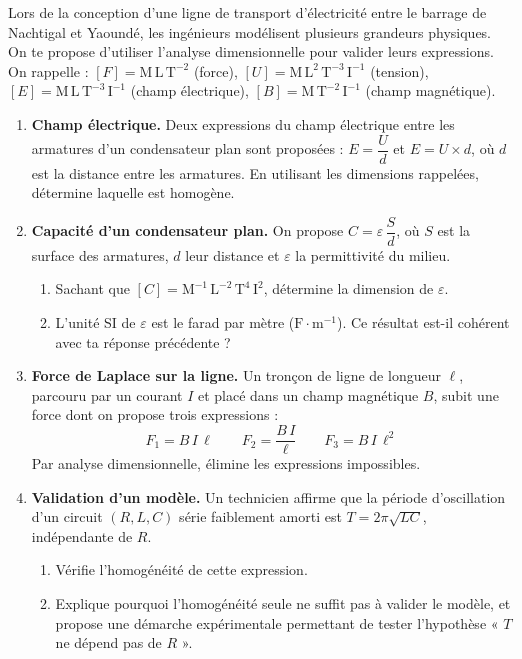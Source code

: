 \documentclass[11pt]{article}
\begin{document}
\begin{exercice}
Lors de la conception d'une ligne de transport d'électricité entre le barrage de Nachtigal et Yaoundé, les ingénieurs modélisent plusieurs grandeurs physiques. On te propose d'utiliser l'analyse dimensionnelle pour valider leurs expressions. On rappelle : $[F] = \text{M}\,\text{L}\,\text{T}^{-2}$ (force), $[U] = \text{M}\,\text{L}^2\,\text{T}^{-3}\,\text{I}^{-1}$ (tension), $[E] = \text{M}\,\text{L}\,\text{T}^{-3}\,\text{I}^{-1}$ (champ électrique), $[B] = \text{M}\,\text{T}^{-2}\,\text{I}^{-1}$ (champ magnétique).
\begin{enumerate}
    \item \textbf{Champ électrique.} Deux expressions du champ électrique entre les armatures d'un condensateur plan sont proposées : $E = \dfrac{U}{d}$ et $E = U \times d$, où $d$ est la distance entre les armatures. En utilisant les dimensions rappelées, détermine laquelle est homogène.
    \item \textbf{Capacité d'un condensateur plan.} On propose $C = \varepsilon\,\dfrac{S}{d}$, où $S$ est la surface des armatures, $d$ leur distance et $\varepsilon$ la permittivité du milieu.
    \begin{enumerate}
        \item Sachant que $[C] = \text{M}^{-1}\,\text{L}^{-2}\,\text{T}^{4}\,\text{I}^{2}$, détermine la dimension de $\varepsilon$.
        \item L'unité SI de $\varepsilon$ est le farad par mètre ($\text{F}\cdot\text{m}^{-1}$). Ce résultat est-il cohérent avec ta réponse précédente ?
    \end{enumerate}
    \item \textbf{Force de Laplace sur la ligne.} Un tronçon de ligne de longueur $\ell$, parcouru par un courant $I$ et placé dans un champ magnétique $B$, subit une force dont on propose trois expressions :
    \[ F_1 = B\,I\,\ell \qquad F_2 = \dfrac{B\,I}{\ell} \qquad F_3 = B\,I\,\ell^2 \]
    Par analyse dimensionnelle, élimine les expressions impossibles.
    \item \textbf{Validation d'un modèle.} Un technicien affirme que la période d'oscillation d'un circuit $(R, L, C)$ série faiblement amorti est $T = 2\pi\sqrt{LC}$, indépendante de $R$.
    \begin{enumerate}
        \item Vérifie l'homogénéité de cette expression.
        \item Explique pourquoi l'homogénéité seule ne suffit pas à valider le modèle, et propose une démarche expérimentale permettant de tester l'hypothèse « $T$ ne dépend pas de $R$ ».
    \end{enumerate}
\end{enumerate}
\end{exercice}
\end{document}
